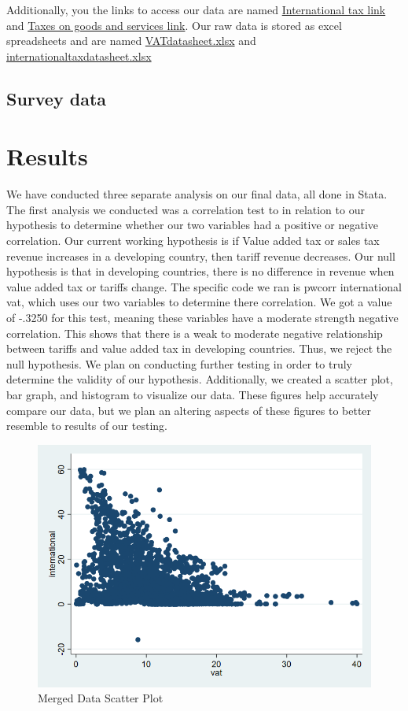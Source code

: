 \documentclass[12pt]{article}
\begin{document}
Additionally, you the links to access our data are named \href{https://wits.worldbank.org/CountryProfile/en/Country/BY-COUNTRY/StartYear/1988/EndYear/2022/Indicator/GC-TAX-INTT-RV-ZS}{International tax link} and \href{https://wits.worldbank.org/CountryProfile/en/country/by-country/startyear/LTST/endyear/LTST/indicator/GC-TAX-GSRV-RV-ZS}{Taxes on goods and services link}. Our raw data is stored as excel spreadsheets and are named \href{https://github.com/ecn310/course-project-taxes-tariffs/blob/main/VATdatasheet.xlsx}{VATdatasheet.xlsx} and \href{https://github.com/ecn310/course-project-taxes-tariffs/blob/main/internationaltaxdatasheet.xlsx}{internationaltaxdatasheet.xlsx}

\subsection{Survey data}

\section{Results}
\label{sec:result}

We have conducted three separate analysis on our final data, all done in Stata. The first analysis we conducted was a correlation test to in relation to our hypothesis to determine whether our two variables had a positive or negative correlation. Our current working hypothesis is if Value added tax or sales tax revenue increases in a developing country, then tariff revenue decreases. Our null hypothesis is that in developing countries, there is no difference in revenue when value added tax or tariffs change. The specific code we ran is pwcorr international vat, which uses our two variables to determine there correlation. We got a value of -.3250 for this test, meaning these variables have a moderate strength negative correlation. This shows that there is a weak to moderate negative relationship between tariffs and value added tax in developing countries. Thus, we reject the null hypothesis. We plan on conducting further testing in order to truly determine the validity of our hypothesis. Additionally, we created a scatter plot, bar graph, and histogram to visualize our data. These figures help accurately compare our data, but we plan an altering aspects of these figures to better resemble to results of our testing. 

\begin{figure}
    \centering
    \includegraphics[width=0.5\linewidth]{mergedscatter.png}
    \caption{Merged Data Scatter Plot}
    \label{fig:enter-label}
\end{figure}
\end{document}
